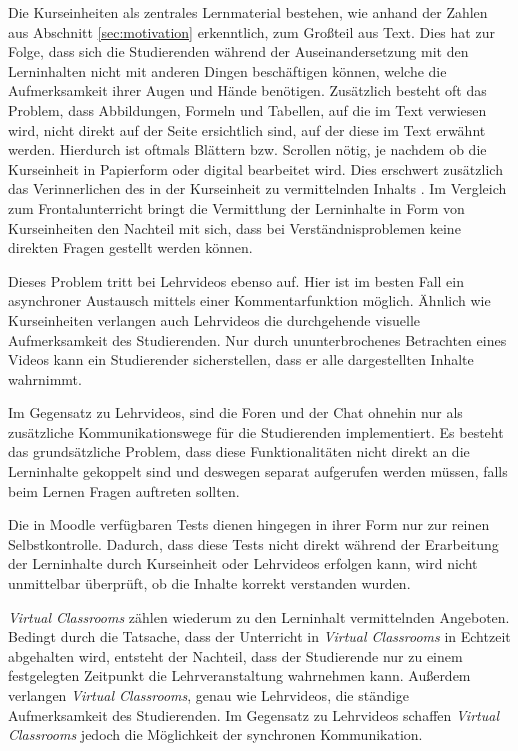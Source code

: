 Die Kurseinheiten als zentrales Lernmaterial bestehen, wie anhand der Zahlen aus Abschnitt \ref{sec:motivation} erkenntlich, zum Großteil aus Text. Dies hat zur Folge, dass sich die Studierenden während der Auseinandersetzung mit den Lerninhalten nicht mit anderen Dingen beschäftigen können, welche die Aufmerksamkeit ihrer Augen und Hände benötigen. Zusätzlich besteht oft das Problem, dass Abbildungen, Formeln und Tabellen, auf die im Text verwiesen wird, nicht direkt auf der Seite ersichtlich sind, auf der diese im Text erwähnt werden. Hierdurch ist oftmals Blättern bzw. Scrollen nötig, je nachdem ob die Kurseinheit in Papierform oder digital bearbeitet wird. Dies erschwert zusätzlich das Verinnerlichen des in der Kurseinheit zu vermittelnden Inhalts \citep{mayer2009multimedia}. Im Vergleich zum Frontalunterricht bringt die Vermittlung der Lerninhalte in Form von Kurseinheiten den Nachteil mit sich, dass bei Verständnisproblemen keine direkten Fragen gestellt werden können.

Dieses Problem tritt bei Lehrvideos ebenso auf. Hier ist im besten Fall ein asynchroner Austausch mittels einer Kommentarfunktion möglich. Ähnlich wie Kurseinheiten verlangen auch Lehrvideos die durchgehende visuelle Aufmerksamkeit des Studierenden. Nur durch ununterbrochenes Betrachten eines Videos kann ein Studierender sicherstellen, dass er alle dargestellten Inhalte wahrnimmt.

Im Gegensatz zu Lehrvideos, sind die Foren und der Chat ohnehin nur als zusätzliche Kommunikationswege für die Studierenden implementiert. Es besteht das grundsätzliche Problem, dass diese Funktionalitäten nicht direkt an die Lerninhalte gekoppelt sind und deswegen separat aufgerufen werden müssen, falls beim Lernen Fragen auftreten sollten. 

Die in Moodle verfügbaren Tests dienen hingegen in ihrer Form nur zur reinen Selbstkontrolle. Dadurch, dass diese Tests nicht direkt während der Erarbeitung der Lerninhalte durch Kurseinheit oder Lehrvideos erfolgen kann, wird nicht unmittelbar überprüft, ob die Inhalte korrekt verstanden wurden.

\textit{Virtual Classrooms} zählen wiederum zu den Lerninhalt vermittelnden Angeboten. Bedingt durch die Tatsache, dass der Unterricht in \textit{Virtual Classrooms} in Echtzeit abgehalten wird, entsteht der Nachteil, dass der Studierende nur zu einem festgelegten Zeitpunkt die Lehrveranstaltung wahrnehmen kann. Außerdem verlangen \textit{Virtual Classrooms}, genau wie Lehrvideos, die ständige Aufmerksamkeit des Studierenden. Im Gegensatz zu Lehrvideos schaffen \textit{Virtual Classrooms} jedoch die Möglichkeit der synchronen Kommunikation.

